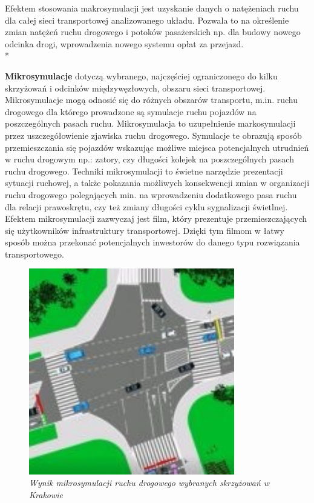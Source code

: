 \documentclass{sprawozdanie-agh}
\begin{document}
	Efektem stosowania makrosymulacji jest uzyskanie danych o natężeniach ruchu dla całej sieci transportowej analizowanego układu. Pozwala to na określenie zmian natężeń ruchu drogowego i potoków pasażerskich np. dla budowy nowego odcinka drogi, wprowadzenia nowego systemu opłat za przejazd. \\*


	\textbf{Mikrosymulacje} dotyczą wybranego, najczęściej ograniczonego do kilku skrzyżowań i odcinków międzywęzłowych, obszaru sieci transportowej. Mikrosymulacje mogą odnosić się do różnych obszarów transportu, m.in. ruchu drogowego dla którego prowadzone są symulacje ruchu pojazdów na poszczególnych pasach ruchu. Mikrosymulacja to uzupełnienie markosymulacji przez uszczegółowienie zjawiska ruchu drogowego. Symulacje te obrazują sposób przemieszczania się pojazdów wskazując możliwe miejsca potencjalnych utrudnień w ruchu drogowym np.: zatory, czy długości kolejek na poszczególnych pasach ruchu drogowego.
	Techniki mikrosymulacji to świetne narzędzie prezentacji sytuacji ruchowej, a także pokazania możliwych konsekwencji zmian w organizacji ruchu drogowego polegających min. na wprowadzeniu dodatkowego pasa ruchu dla relacji prawoskrętu, czy też zmiany długości cyklu sygnalizacji świetlnej. Efektem mikrosymulacji zazwyczaj jest film, który prezentuje przemieszczających się użytkowników infrastruktury transportowej. Dzięki tym filmom w łatwy sposób można przekonać potencjalnych inwestorów do danego typu rozwiązania transportowego.

	\begin{figure}[H]
		\centering
		\includegraphics[width=0.8\textwidth]{Mikrosymulacja.jpg}
		\caption{\textit{Wynik mikrosymulacji ruchu drogowego wybranych skrzyżowań w Krakowie}}
		\label{fig:Mikrosymulacja}
	\end{figure}
\end{document}
